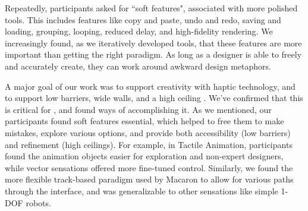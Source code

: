 Repeatedly, participants asked for ``soft features", associated with more polished tools.
This includes features like copy and paste, undo and redo, saving and loading, grouping, looping, reduced delay, and high-fidelity rendering.
We increasingly found, as we iteratively developed \haxd tools, that these features are more important than getting the right paradigm.
As long as a designer is able to freely and accurately create, they can work around awkward design metaphors.

A major goal of our work was to support creativity with haptic technology, and to support low barriers, wide walls, and a high ceiling \cite{Shneiderman2007,Resnick2008}.
We've confirmed that this is critical for \haxd, and found ways of accomplishing it.
As we mentioned, our participants found soft features essential, which helped to free them to make mistakes, explore various options, and provide both accessibility (low barriers) and refinement (high ceilings).
For example, in Tactile Animation, participants found the animation objects easier for exploration and non-expert designers, while vector sensations offered more fine-tuned control.
Similarly, we found the more flexible track-based paradigm used by Macaron to allow for various paths through the interface, and was generalizable to other sensations like simple 1-DOF robots.


%
%

